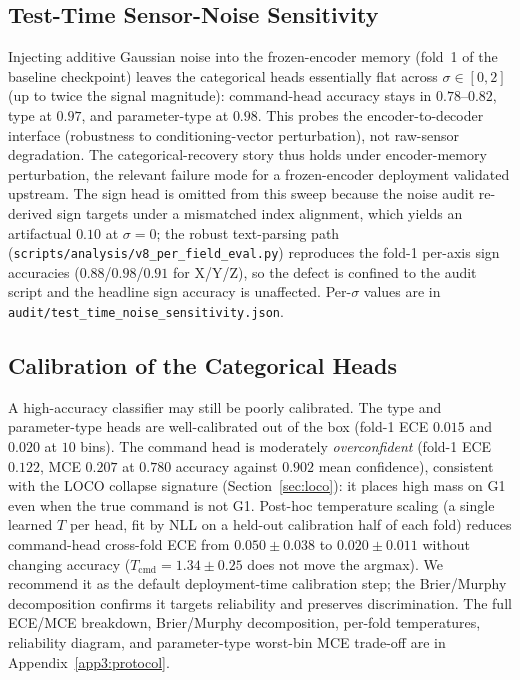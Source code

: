 \documentclass[sensors,article,submit,moreauthors,pdftex]{Definitions/mdpi}
\begin{document}
\subsection{Test-Time Sensor-Noise Sensitivity}
\label{sec:noise-sensitivity}

Injecting additive Gaussian noise into the frozen-encoder memory (fold~1 of the baseline checkpoint) leaves the categorical heads essentially flat across $\sigma \in [0, 2]$ (up to twice the signal magnitude): command-head accuracy stays in $0.78$--$0.82$, type at $0.97$, and parameter-type at $0.98$. This probes the encoder-to-decoder interface (robustness to conditioning-vector perturbation), not raw-sensor degradation. The categorical-recovery story thus holds under encoder-memory perturbation, the relevant failure mode for a frozen-encoder deployment validated upstream. The sign head is omitted from this sweep because the noise audit re-derived sign targets under a mismatched index alignment, which yields an artifactual $0.10$ at $\sigma=0$; the robust text-parsing path (\texttt{scripts/analysis/v8\_per\_field\_eval.py}) reproduces the fold-1 per-axis sign accuracies ($0.88$/$0.98$/$0.91$ for X/Y/Z), so the defect is confined to the audit script and the headline sign accuracy is unaffected. Per-$\sigma$ values are in \texttt{audit/test\_time\_noise\_sensitivity.json}.

\subsection{Calibration of the Categorical Heads}
\label{sec:calibration}

A high-accuracy classifier may still be poorly calibrated. The type and parameter-type heads are well-calibrated out of the box (fold-1 ECE $0.015$ and $0.020$ at $10$ bins). The command head is moderately \emph{overconfident} (fold-1 ECE $0.122$, MCE $0.207$ at $0.780$ accuracy against $0.902$ mean confidence), consistent with the LOCO collapse signature (Section~\ref{sec:loco}): it places high mass on G1 even when the true command is not G1. Post-hoc temperature scaling (a single learned $T$ per head, fit by NLL on a held-out calibration half of each fold) reduces command-head cross-fold ECE from $0.050 \pm 0.038$ to $0.020 \pm 0.011$ without changing accuracy ($T_{\text{cmd}} = 1.34 \pm 0.25$ does not move the argmax). We recommend it as the default deployment-time calibration step; the Brier/Murphy decomposition confirms it targets reliability and preserves discrimination. The full ECE/MCE breakdown, Brier/Murphy decomposition, per-fold temperatures, reliability diagram, and parameter-type worst-bin MCE trade-off are in Appendix~\ref{app3:protocol}.
\end{document}
